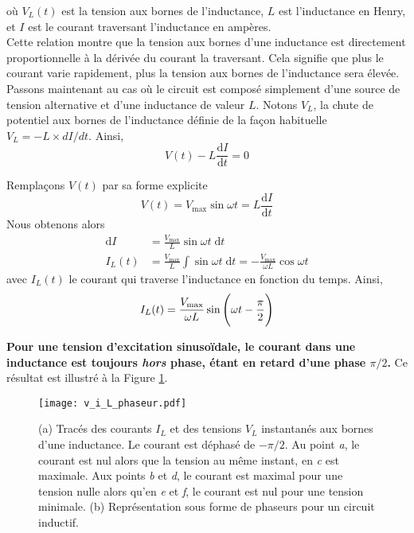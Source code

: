 \documentclass[titlepage,oneside,a4paper,11pt]{book} %
\begin{document}
où $V_L(t)$ est la tension aux bornes de l’inductance, $L$ est l’inductance en Henry, et $I$ est le courant traversant l’inductance en ampères.\\

Cette relation montre que la tension aux bornes d’une inductance est directement proportionnelle à la dérivée du courant la traversant. Cela signifie que plus le courant varie rapidement, plus la tension aux bornes de l’inductance sera élevée.\\ %

Passons maintenant au cas où le circuit est composé simplement d'une source de tension alternative et d'une inductance de valeur $L$. Notons $V_L$, la chute de potentiel aux bornes de l'inductance définie de la façon habituelle $V_L = -L\times dI/dt$. Ainsi, 
\begin{equation*}
    V(t) -L\frac{\mathrm{d}I}{\mathrm{d}t} = 0
\end{equation*}

Remplaçons $V(t)$ par sa forme explicite
\begin{equation}
    V(t) = V_{\mathrm{max}}\sin \omega t =L\frac{\mathrm{d}I}{\mathrm{d}t}
    \label{eq:L_voltage}
\end{equation}
Nous obtenons alors
\begin{align*}
    \mathrm{d}I &= \frac{V_{\mathrm{max}}}{L} \sin \omega t \;\mathrm{d}t\\
    I_L(t) &= \frac{V_{\mathrm{max}}}{L}\int \sin \omega t\; \mathrm{d}t = -\frac{V_{\mathrm{max}}}{\omega L}\cos \omega t
\end{align*}
avec $I_L(t)$ le courant qui traverse l'inductance en fonction du temps. Ainsi,
\begin{equation}
    I_L(t) = \frac{V_{\mathrm{max}}}{\omega L} \sin \Bigg{(}\omega t - \frac{\pi}{2}\Bigg{)}
    \label{eq:i_ind}
\end{equation}

\textbf{Pour une tension d'excitation sinusoïdale, le courant dans une inductance est toujours \emph{hors} phase, étant en retard d'une phase $\pi/2$.} Ce résultat est illustré à la Figure \ref{fig:ind_phaseurs}. \\ 

\begin{figure}[H]
\centering
\texttt{[image: v\_i\_L\_phaseur.pdf]}
\caption{(a) Tracés des courants $I_L$ et des tensions $V_L$ instantanés aux bornes d'une inductance. Le courant est déphasé de $-\pi/2$. Au point \emph{a}, le courant est nul alors que la tension au même instant, en \emph{c} est maximale. Aux points \emph{b} et \emph{d}, le courant est maximal pour une tension nulle alors qu'en \emph{e} et \emph{f}, le courant est nul pour une tension minimale. (b) Représentation sous forme de phaseurs pour un circuit inductif.}
\label{fig:ind_phaseurs}
\end{figure}
\end{document}
